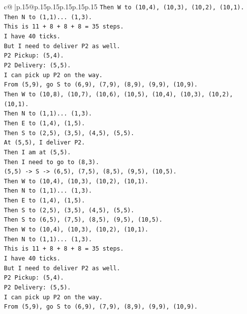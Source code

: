 \documentclass{article}
\begin{document}
{\begin{supertabular}{c@{$\;$}|p{.15\linewidth}@{}p{.15\linewidth}p{.15\linewidth}p{.15\linewidth}p{.15\linewidth}p{.15\linewidth}}
{{{\texttt{Then W to (10,4), (10,3), (10,2), (10,1).} \\
\texttt{Then N to (1,1)... (1,3).} \\
\texttt{This is 11 + 8 + 8 + 8 = 35 steps.} \\
\texttt{I have 40 ticks.} \\
\texttt{But I need to deliver P2 as well.} \\
\texttt{P2 Pickup: (5,4).} \\
\texttt{P2 Delivery: (5,5).} \\
\texttt{I can pick up P2 on the way.} \\
\texttt{From (5,9), go S to (6,9), (7,9), (8,9), (9,9), (10,9).} \\
\texttt{Then W to (10,8), (10,7), (10,6), (10,5), (10,4), (10,3), (10,2), (10,1).} \\
\texttt{Then N to (1,1)... (1,3).} \\
\texttt{Then E to (1,4), (1,5).} \\
\texttt{Then S to (2,5), (3,5), (4,5), (5,5).} \\
\texttt{At (5,5), I deliver P2.} \\
\texttt{Then I am at (5,5).} \\
\texttt{Then I need to go to (8,3).} \\
\texttt{(5,5) {-}> S {-}> (6,5), (7,5), (8,5), (9,5), (10,5).} \\
\texttt{Then W to (10,4), (10,3), (10,2), (10,1).} \\
\texttt{Then N to (1,1)... (1,3).} \\
\texttt{Then E to (1,4), (1,5).} \\
\texttt{Then S to (2,5), (3,5), (4,5), (5,5).} \\
\texttt{Then S to (6,5), (7,5), (8,5), (9,5), (10,5).} \\
\texttt{Then W to (10,4), (10,3), (10,2), (10,1).} \\
\texttt{Then N to (1,1)... (1,3).} \\
\texttt{This is 11 + 8 + 8 + 8 = 35 steps.} \\
\texttt{I have 40 ticks.} \\
\texttt{But I need to deliver P2 as well.} \\
\texttt{P2 Pickup: (5,4).} \\
\texttt{P2 Delivery: (5,5).} \\
\texttt{I can pick up P2 on the way.} \\
\texttt{From (5,9), go S to (6,9), (7,9), (8,9), (9,9), (10,9).} \\
}}}
\end{supertabular}}
\end{document}
